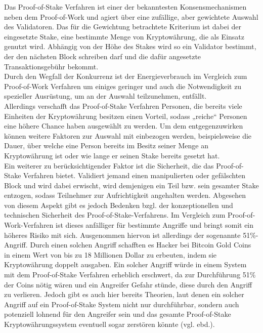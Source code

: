Das Proof-of-Stake Verfahren ist einer der bekanntesten Konsensmechanismen neben dem Proof-of-Work und agiert über eine zufällige, aber gewichtete Auswahl des Validatoren. Das für die Gewichtung betrachtete Kriterium ist dabei der eingesetzte Stake, eine bestimmte Menge von Kryptowährung, die als Einsatz genutzt wird. Abhängig von der Höhe des Stakes wird so ein Validator bestimmt, der den nächsten Block schreiben darf und die dafür angesetzte Transaktionsgebühr bekommt.\\
Durch den Wegfall der Konkurrenz ist der Energieverbrauch im Vergleich zum Proof-of-Work Verfahren um einiges geringer und auch die Notwendigkeit zu spezieller Ausrüstung, um an der Auswahl teilzunehmen, entfällt.\\
Allerdings verschafft das Proof-of-Stake Verfahren Personen, die bereits viele Einheiten der Kryptowährung besitzen einen Vorteil, sodass „reiche“ Personen eine höhere Chance haben ausgewählt zu werden. Um dem entgegenzuwirken können weitere Faktoren zur Auswahl mit einbezogen werden, beispielsweise die Dauer, über welche eine Person bereits im Besitz seiner Menge an Kryptowährung ist oder wie lange er seinen Stake bereits gesetzt hat.\\
Ein weiterer zu berücksichtigender Faktor ist die Sicherheit, die das Proof-of-Stake Verfahren bietet. Validiert jemand einen manipulierten oder gefälschten Block und wird dabei erwischt, wird demjenigen ein Teil bzw. sein gesamter Stake entzogen, sodass Teilnehmer zur Aufrichtigkeit angehalten werden. Abgesehen von diesem Aspekt gibt es jedoch Bedenken bzgl. der konzeptionellen und technischen Sicherheit des Proof-of-Stake-Verfahrens. Im Vergleich zum Proof-of-Work-Verfahren ist dieses anfälliger für bestimmte Angriffe und bringt somit ein höheres Risiko mit sich. Ausgenommen hiervon ist allerdings der sogenannte 51\%-Angriff. Durch einen solchen Angriff schafften es Hacker bei Bitcoin Gold Coins in einem Wert von bis zu 18 Millionen Dollar zu erbeuten, indem sie Kryptowährung doppelt ausgaben. Ein solcher Angriff würde in einem System mit dem Proof-of-Stake Verfahren erheblich erschwert, da zur Durchführung 51\% der Coins nötig wären und ein Angreifer Gefahr stünde, diese durch den Angriff zu verlieren. Jedoch gibt es auch hier bereits Theorien, laut denen ein solcher Angriff auf ein Proof-of-Stake System nicht nur durchführbar, sondern auch potenziell lohnend für den Angreifer sein und das gesamte Proof-of-Stake Kryptowährungssystem eventuell sogar zerstören könnte (vgl. ebd.).